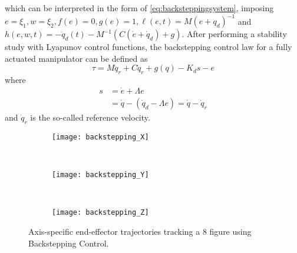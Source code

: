 which can be interpreted in the form of \eqref{eq:backsteppingsystem}, imposing $e=\xi_1, w=\xi_2, f(e)=0, g(e)=1, \ell(e,t)=M(e+q_d)^{-1}$ and $h(e,w,t)=-\ddot{q}_d(t)-M^{-1}\left(C(\dot{e}+\dot{q}_d)+g\right)$. After performing a stability study with Lyapunov control functions, the backstepping control law for a fully actuated manipulator can be defined as
\begin{equation}
\tau = M\ddot{q}_r + C\dot{q}_r + g(q) - K_{d}s - e
\label{eq:backsteppingcontrollaw}
\end{equation}
where
\begin{align*}
s &= \dot{e} + \Lambda{e}\\
&= \dot{q} - (\dot{q}_d - \Lambda{e}) = \dot{q} - \dot{q}_r
\end{align*}
and $\dot{q}_r$ is the so-called reference velocity. 

\begin{figure}[H]
	\centering
	\begin{subfigure}[t]{\textwidth}
		\texttt{[image: backstepping\_X]}
	\end{subfigure}
	\\
	\begin{subfigure}[t]{\textwidth}
		\texttt{[image: backstepping\_Y]}
	\end{subfigure}
	\\
	\begin{subfigure}[t]{\textwidth}
		\texttt{[image: backstepping\_Z]}
	\end{subfigure}
	\caption{Axis-specific end-effector trajectories tracking a 8 figure using Backstepping Control.}
\end{figure}

